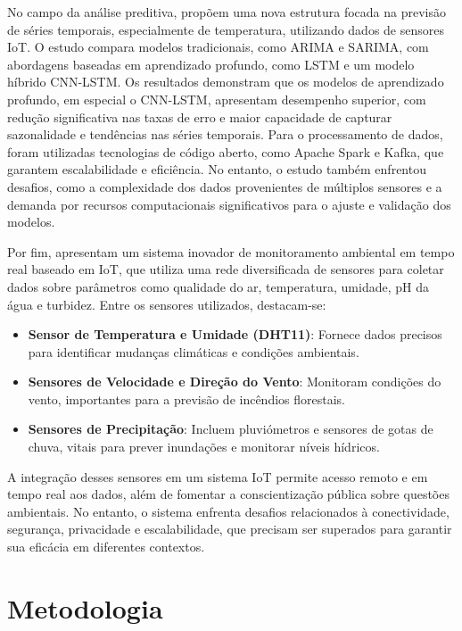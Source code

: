 \documentclass[12pt, a4paper]{article}
\begin{document}
No campo da análise preditiva, \cite{Selmy2024} propõem uma nova estrutura focada na previsão de séries temporais,
especialmente de temperatura, utilizando dados de sensores IoT. O estudo compara modelos tradicionais, como ARIMA e
SARIMA, com abordagens baseadas em aprendizado profundo, como LSTM e um modelo híbrido CNN-LSTM. Os resultados
demonstram que os modelos de aprendizado profundo, em especial o CNN-LSTM, apresentam desempenho superior, com redução
significativa nas taxas de erro e maior capacidade de capturar sazonalidade e tendências nas séries temporais. Para o
processamento de dados, foram utilizadas tecnologias de código aberto, como Apache Spark e Kafka, que garantem
escalabilidade e eficiência. No entanto, o estudo também enfrentou desafios, como a complexidade dos dados provenientes
de múltiplos sensores e a demanda por recursos computacionais significativos para o ajuste e validação dos modelos.

Por fim, \cite{NARAYANA2024e28195} apresentam um sistema inovador de monitoramento ambiental em tempo real baseado em
IoT, que utiliza uma rede diversificada de sensores para coletar dados sobre parâmetros como qualidade do ar,
temperatura, umidade, pH da água e turbidez. Entre os sensores utilizados, destacam-se:

\begin{itemize}
    \item \textbf{Sensor de Temperatura e Umidade (DHT11)}: Fornece dados precisos para identificar mudanças climáticas e condições ambientais.
    \item \textbf{Sensores de Velocidade e Direção do Vento}: Monitoram condições do vento, importantes para a previsão de incêndios florestais.
    \item \textbf{Sensores de Precipitação}: Incluem pluviómetros e sensores de gotas de chuva, vitais para prever inundações e monitorar níveis hídricos.
\end{itemize}

A integração desses sensores em um sistema IoT permite acesso remoto e em tempo real aos dados, além de fomentar a
conscientização pública sobre questões ambientais. No entanto, o sistema enfrenta desafios relacionados à conectividade,
segurança, privacidade e escalabilidade, que precisam ser superados para garantir sua eficácia em diferentes contextos.


\section{Metodologia}
\label{sec:metodologia}
\end{document}
